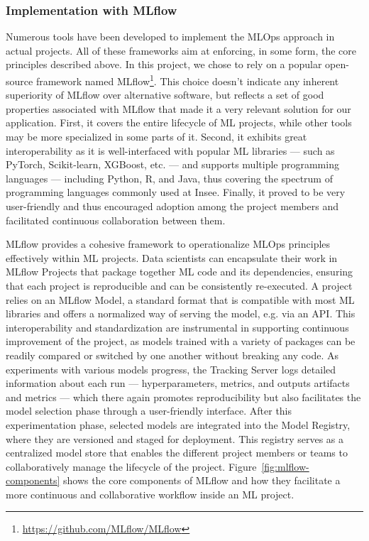 \documentclass[graybox]{svmult}
\begin{document}
\subsubsection{Implementation with MLflow}

Numerous tools have been developed to implement the MLOps approach in actual projects. All of these frameworks aim at enforcing, in some form, the core principles described above. In this project, we chose to rely on a popular open-source framework named MLflow\footnote{\url{https://github.com/MLflow/MLflow}}. This choice doesn't indicate any inherent superiority of MLflow over alternative software, but reflects a set of good properties associated with MLflow that made it a very relevant solution for our application. First, it covers the entire lifecycle of ML projects, while other tools may be more specialized in some parts of it. Second, it exhibits great interoperability as it is well-interfaced with popular ML libraries — such as PyTorch, Scikit-learn, XGBoost, etc. — and supports multiple programming languages — including Python, R, and Java, thus covering the spectrum of programming languages commonly used at Insee. Finally, it proved to be very user-friendly and thus encouraged adoption among the project members and facilitated continuous collaboration between them.

MLflow provides a cohesive framework to operationalize MLOps principles effectively within ML projects. Data scientists can encapsulate their work in MLflow Projects that package together ML code and its dependencies, ensuring that each project is reproducible and can be consistently re-executed. A project relies on an MLflow Model, a standard format that is compatible with most ML libraries and offers a normalized way of serving the model, e.g. via an API. This interoperability and standardization are instrumental in supporting continuous improvement of the project, as models trained with a variety of packages can be readily compared or switched by one another without breaking any code. As experiments with various models progress, the Tracking Server logs detailed information about each run — hyperparameters, metrics, and outputs artifacts and metrics — which there again promotes reproducibility but also facilitates the model selection phase through a user-friendly interface. After this experimentation phase, selected models are integrated into the Model Registry, where they are versioned and staged for deployment. This registry serves as a centralized model store that enables the different project members or teams to collaboratively manage the lifecycle of the project. Figure~\ref{fig:mlflow-components} shows the core components of MLflow and how they facilitate a more continuous and collaborative workflow inside an ML project.
\end{document}
